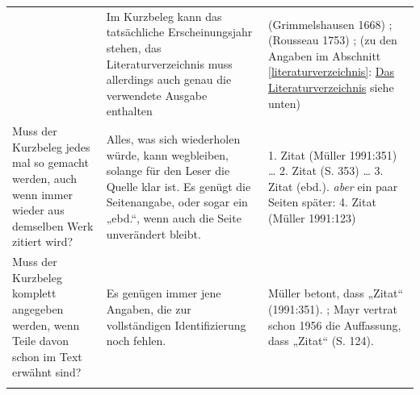 \documentclass[]{book}
\theoremstyle{definition}
\theoremstyle{definition}
\theoremstyle{definition}
\theoremstyle{remark}
\begin{document}
\begin{longtable}[]{@{}lll@{}}
\begin{minipage}[t]{0.26\columnwidth}
\end{minipage} & \begin{minipage}[t]{0.33\columnwidth}\raggedright\strut
Im Kurzbeleg kann das tatsächliche Erscheinungsjahr stehen, das
Literaturverzeichnis muss allerdings auch genau die verwendete Ausgabe
enthalten\strut
\end{minipage} & \begin{minipage}[t]{0.32\columnwidth}\raggedright\strut
(Grimmelshausen 1668) ; (Rousseau 1753) ; (zu den Angaben im Abschnitt
\ref{literaturverzeichnis}: \protect\hyperlink{literaturverzeichnis}{Das
Literaturverzeichnis} siehe unten) \vspace{-6mm}\strut
\end{minipage}\tabularnewline
\begin{minipage}[t]{0.26\columnwidth}\raggedright\strut
Muss der Kurzbeleg jedes mal so gemacht werden, auch wenn immer wieder
aus demselben Werk zitiert wird?\strut
\end{minipage} & \begin{minipage}[t]{0.33\columnwidth}\raggedright\strut
Alles, was sich wiederholen würde, kann wegbleiben, solange für den
Leser die Quelle klar ist. Es genügt die Seitenangabe, oder sogar ein
„ebd.``, wenn auch die Seite unverändert bleibt.\strut
\end{minipage} & \begin{minipage}[t]{0.32\columnwidth}\raggedright\strut
1. Zitat (Müller 1991:351) \ldots{} 2. Zitat (S. 353) \ldots{} 3. Zitat
(ebd.). \emph{aber} ein paar Seiten später: 4. Zitat (Müller 1991:123)
\vspace{-6mm}\strut
\end{minipage}\tabularnewline
\begin{minipage}[t]{0.26\columnwidth}\raggedright\strut
Muss der Kurzbeleg komplett angegeben werden, wenn Teile davon schon im
Text erwähnt sind?\strut
\end{minipage} & \begin{minipage}[t]{0.33\columnwidth}\raggedright\strut
Es genügen immer jene Angaben, die zur vollständigen Identifizierung
noch fehlen.\strut
\end{minipage} & \begin{minipage}[t]{0.32\columnwidth}\raggedright\strut
Müller betont, dass „Zitat`` (1991:351). ; Mayr vertrat schon 1956 die
Auffassung, dass „Zitat`` (S. 124). \vspace{-6mm}\strut
\end{minipage}\tabularnewline
\begin{minipage}[t]{0.26\columnwidth}\raggedright\strut

\end{minipage}
\end{longtable}
\end{document}
